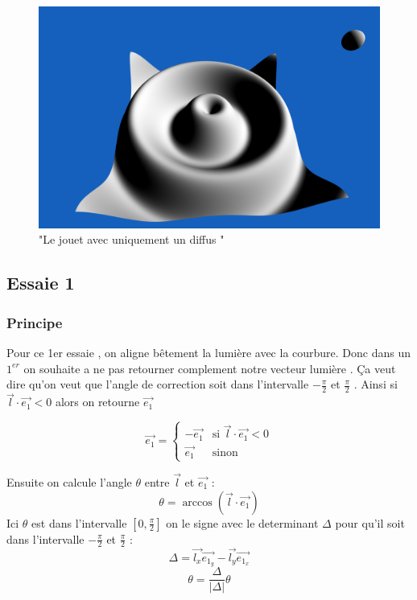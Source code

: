 \documentclass[a4paper]{article}
\begin{document}
\begin{figure}[thb]
	\centering
    \includegraphics[scale=0.3]{Images/Essais/phong_toy.png}
    \caption{"Le jouet avec uniquement un diffus "}
 \end{figure}


\subsection{Essaie 1}

\subsubsection{Principe}
Pour ce 1er essaie , on aligne bêtement la lumière avec la courbure.
Donc dans un $1^{er}$ on souhaite a ne pas retourner complement notre vecteur lumière . Ça veut dire qu'on veut que l'angle de correction soit dans l'intervalle  $-\frac{\pi}{2}$ et $\frac{\pi}{2}$ . Ainsi si $\vec{l} \cdot{\vec{e_1}} < 0 $ alors on retourne $\vec{e_1} $


\[ \vec{e_1} = 
\left\{
    \begin{array}{ll}
        -\vec{e_1} & \mbox{si } \vec{l} \cdot{\vec{e_1}} < 0 \\
		\vec{e_1}  & \mbox{sinon}				
    \end{array}
\right.
\]

Ensuite on calcule l'angle $\theta$ entre $\vec{l}$ et $\vec{e_1}$ :
\[ \theta =  \arccos( \vec{l} \cdot{\vec{e_1}}) \]
Ici $\theta$ est dans l'intervalle  $[0,\frac{\pi}{2}]$ on le signe avec le determinant $\Delta$ pour qu'il soit dans l'intervalle $-\frac{\pi}{2}$ et $\frac{\pi}{2}$ :
\[\Delta =  \vec{l_x}\vec{e_{1_y}} - \vec{l_y}\vec{e_{1_x}}\]
\[\theta = \frac{\Delta}{|\Delta|}  \theta\]
\end{document}
